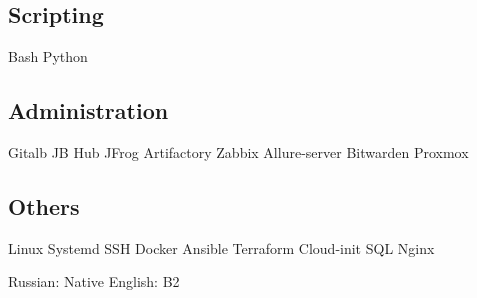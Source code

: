 \documentclass[a4paper]{MagicalCV}
\begin{document}
\begin{minipage}[t]{0.34\textwidth}
\subsection{Scripting}
Bash \textbullet{} 
Python
\subsection{Administration}
Gitalb \textbullet{} 
JB Hub \textbullet{} 
JFrog Artifactory \textbullet{} 
Zabbix \textbullet{} 
Allure-server \textbullet{} 
Bitwarden \textbullet{} 
Proxmox
\subsection{Others}
Linux \textbullet{} 
Systemd \textbullet{} 
SSH \textbullet{} 
Docker \textbullet{} 
Ansible \textbullet{} 
Terraform \textbullet{} 
Cloud-init \textbullet{} 
SQL \textbullet{} 
Nginx
\sectionsep


Russian: Native \textbullet{} English: B2
\sectionsep

\end{minipage} 
\hfill
\end{document}
